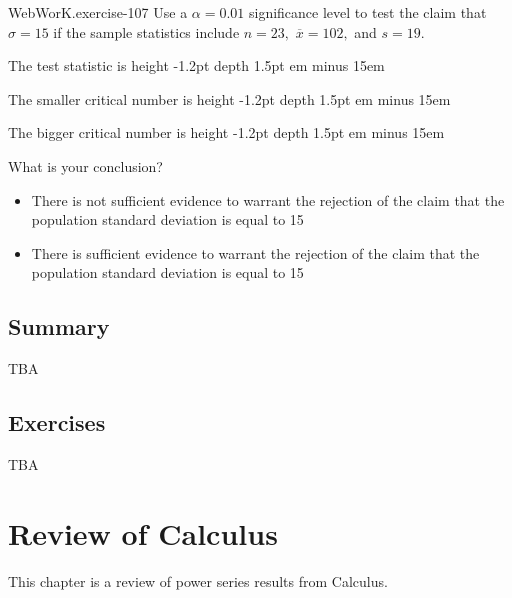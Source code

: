 \documentclass[10pt,]{book}
\newcommand{\fillin}[1]{\leavevmode\leaders\vrule height -1.2pt depth 1.5pt \hskip #1em minus #1em \null}
\numberwithin{equation}{section}
\begin{document}
\begin{inlineexercise}{WebWorK.}{exercise-107}%
\hypertarget{p-1512}{}%
Use a \(\alpha = 0.01\) significance level to test the claim that \(\sigma = 15\) if the sample statistics include \(n = 23,\) \(\overline{x} = 102,\) and \(s = 19.\)%
\par
\hypertarget{p-1513}{}%
The test statistic is  \fillin{15}%
\par
\hypertarget{p-1514}{}%
The smaller critical number is  \fillin{15}%
\par
\hypertarget{p-1515}{}%
The bigger critical number is  \fillin{15}%
\par
\hypertarget{p-1516}{}%
What is your conclusion?%
\par
\hypertarget{p-1517}{}%
\par
\begin{itemize}[label=$\odot$,leftmargin=3em,]
\item{}\hypertarget{p-1518}{}%
There is not sufficient evidence to warrant the rejection of the claim that the population standard deviation is equal to 15%

\item{}\hypertarget{p-1519}{}%
There is sufficient evidence to warrant the rejection of the claim that the population standard deviation is equal to 15%

\end{itemize}
%
\end{inlineexercise}
%
%
%
\typeout{************************************************}
\typeout{************************************************}
%
\section[{Summary}]{Summary}\label{section-77}
\hypertarget{p-1520}{}%
TBA%
%
%
\typeout{************************************************}
\typeout{************************************************}
%
\section[{Exercises}]{Exercises}\label{section-78}
\hypertarget{p-1521}{}%
TBA%
%
%
\typeout{************************************************}
\typeout{************************************************}
%
\chapter[{Review of Calculus}]{Review of Calculus}\label{PowerSeriesReview}
\hypertarget{p-1522}{}%
This chapter is a review of power series results from Calculus.%
%
%
\typeout{************************************************}
\typeout{************************************************}
%
\end{document}
